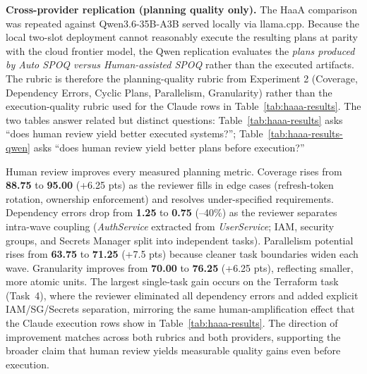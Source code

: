 \textbf{Cross-provider replication (planning quality only).}
The HaaA comparison was repeated against Qwen3.6-35B-A3B served locally via llama.cpp. Because the local two-slot deployment cannot reasonably execute the resulting plans at parity with the cloud frontier model, the Qwen replication evaluates the \textit{plans produced by Auto SPOQ versus Human-assisted SPOQ} rather than the executed artifacts. The rubric is therefore the planning-quality rubric from Experiment 2 (Coverage, Dependency Errors, Cyclic Plans, Parallelism, Granularity) rather than the execution-quality rubric used for the Claude rows in Table~\ref{tab:haaa-results}. The two tables answer related but distinct questions: Table~\ref{tab:haaa-results} asks ``does human review yield better executed systems?''; Table~\ref{tab:haaa-results-qwen} asks ``does human review yield better plans before execution?''

\begin{table}[t]
\centering
\caption{Experiment 4 hardware-bounded planning replication. Mean of four benchmark tasks. Plan quality scored on the Experiment 2 rubric; higher is better except Dep. Errors (lower better) and Cyclic Plans (lower better).}
\label{tab:haaa-results-qwen}
\end{table}

Human review improves every measured planning metric. Coverage rises from \textbf{88.75} to \textbf{95.00} (+6.25 pts) as the reviewer fills in edge cases (refresh-token rotation, ownership enforcement) and resolves under-specified requirements. Dependency errors drop from \textbf{1.25} to \textbf{0.75} (--40\%) as the reviewer separates intra-wave coupling (\emph{AuthService} extracted from \emph{UserService}; IAM, security groups, and Secrets Manager split into independent tasks). Parallelism potential rises from \textbf{63.75} to \textbf{71.25} (+7.5 pts) because cleaner task boundaries widen each wave. Granularity improves from \textbf{70.00} to \textbf{76.25} (+6.25 pts), reflecting smaller, more atomic units. The largest single-task gain occurs on the Terraform task (Task~4), where the reviewer eliminated all dependency errors and added explicit IAM/SG/Secrets separation, mirroring the same human-amplification effect that the Claude execution rows show in Table~\ref{tab:haaa-results}. The direction of improvement matches across both rubrics and both providers, supporting the broader claim that human review yields measurable quality gains even before execution.


